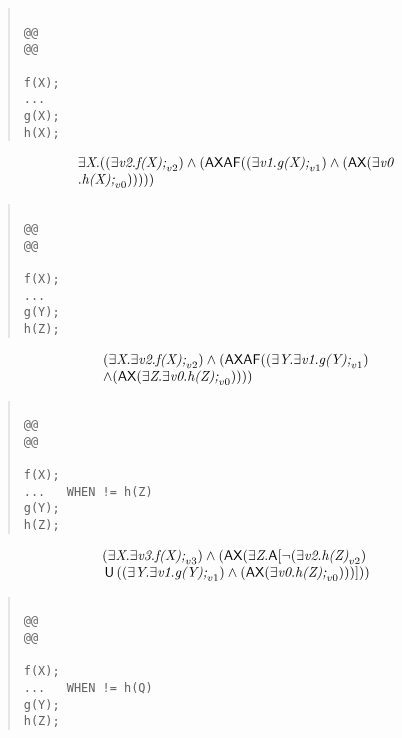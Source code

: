 \documentclass{article}
\newcommand{\U}{\,\mbox{\sf{U}}\,}
\newcommand{\A}{\mbox{\sf{A}}}
\newcommand{\AX}{\mbox{\sf{AX}}}
\newcommand{\AF}{\mbox{\sf{AF}}}
\newcommand{\mita}[1]{\mbox{\it{{#1}}}}
\begin{document}
\begin{quote}\begin{verbatim}

@@
@@

f(X);
...
g(X);
h(X);
\end{verbatim}\end{quote}

\[\begin{array}{l}
\exists \mita{X} . ((\exists \mita{v2} . \mita{f(X);}_{v2}) \wedge (\AX\AF((\exists \mita{v1} . \mita{g(X);}_{v1}) \wedge (\AX(\exists \mita{v0}\\ . \mita{h(X);}_{v0})))))
\end{array}\]

\begin{quote}\begin{verbatim}

@@
@@

f(X);
...
g(Y);
h(Z);
\end{verbatim}\end{quote}

\[\begin{array}{l}
(\exists \mita{X} . \exists \mita{v2} . \mita{f(X);}_{v2}) \wedge (\AX\AF((\exists \mita{Y} . \exists \mita{v1} . \mita{g(Y);}_{v1})\\ \wedge (\AX(\exists \mita{Z} . \exists \mita{v0} . \mita{h(Z);}_{v0}))))
\end{array}\]

\begin{quote}\begin{verbatim}

@@
@@

f(X);
...   WHEN != h(Z)
g(Y);
h(Z);
\end{verbatim}\end{quote}

\[\begin{array}{l}
(\exists \mita{X} . \exists \mita{v3} . \mita{f(X);}_{v3}) \wedge (\AX(\exists \mita{Z} . \A[\neg (\exists \mita{v2} . \mita{h(Z)}_{v2})\\ \U ((\exists \mita{Y} . \exists \mita{v1} . \mita{g(Y);}_{v1}) \wedge (\AX(\exists \mita{v0} . \mita{h(Z);}_{v0})))]
))
\end{array}\]

\begin{quote}\begin{verbatim}

@@
@@

f(X);
...   WHEN != h(Q)
g(Y);
h(Z);
\end{verbatim}\end{quote}
\end{document}
